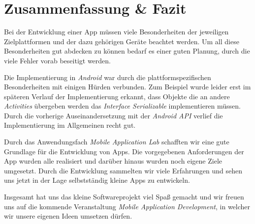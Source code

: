 \chapter{Zusammenfassung \& Fazit}
\label{cha:fazit}

Bei der Entwicklung einer App müssen viele Besonderheiten der jeweiligen Zielplattformen und der dazu gehörigen Geräte beachtet werden. Um all diese Besonderheiten gut abdecken zu können bedarf es einer guten Planung, durch die viele Fehler vorab beseitigt werden.

Die Implementierung in \textit{Android} war durch die plattformspezifischen Besonderheiten mit einigen Hürden verbunden. Zum Beispiel wurde leider erst im späteren Verlauf der Implementierung erkannt, dass Objekte die an andere \textit{Activities} übergeben werden das \textit{Interface Serializable} implementieren müssen. Durch die vorherige Auseinandersetzung mit der \textit{Android API} verlief die Implementierung im Allgemeinen recht gut.

Durch das Anwendungsfach \textit{Mobile Application Lab} schafften wir eine gute Grundlage für die Entwicklung von Apps. Die vorgegebenen Anforderungen der App wurden alle realisiert und darüber hinaus wurden noch eigene Ziele umgesetzt. Durch die Entwicklung sammelten wir viele Erfahrungen und sehen uns jetzt in der Lage selbstständig kleine Apps zu entwickeln.

Insgesamt hat uns das kleine Softwareprojekt viel Spaß gemacht und wir freuen uns auf die kommende Veranstaltung \textit{Mobile Application Development}, in welcher wir unsere eigenen Ideen umsetzen dürfen.


